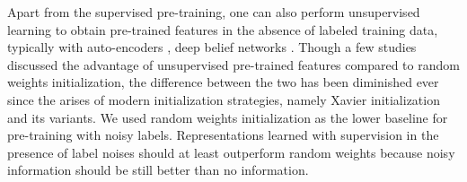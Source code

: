 


Apart from the supervised pre-training, one can also perform unsupervised learning to obtain pre-trained features in the absence of labeled training data, typically with auto-encoders \cite{vincent2010stacked,masci2011stacked}, deep belief networks \cite{hinton2006fast,lee2009convolutional}.
Though a few studies \cite{erhan2009difficulty,erhan2010does,bengio2012deep} discussed the advantage of unsupervised pre-trained features compared to random weights initialization, the difference between the two has been diminished ever since the arises of modern initialization strategies, namely Xavier initialization \cite{glorot2010understanding} and its variants.
We used random weights initialization as the lower baseline for pre-training with noisy labels.
Representations learned with supervision in the presence of label noises should at least outperform random weights because noisy information should be still better than no information.

